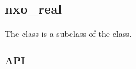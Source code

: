 %
%
%
%
%

\subsection{nxo\_real}
\label{nxo_real}

The  class is a subclass of the  class.

\subsubsection{API}
